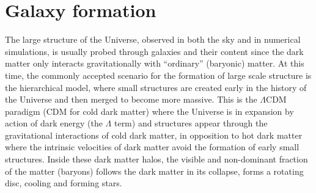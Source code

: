 \section{Galaxy formation}
\label{sec:galaxy_formation}

The large structure of the Universe, observed in both the sky and in numerical
simulations, is usually probed through galaxies and their content since the
dark matter only interacts gravitationally with ``ordinary'' (baryonic) matter.
At this time, the commonly accepted scenario for the formation of large scale
structure is the hierarchical model, where small structures are created early
in the history of the Universe and then merged to become more massive. This is
the $\Lambda$CDM paradigm (CDM for cold dark matter) where the Universe is in
expansion by action of dark energy (the $\Lambda$ term) and structures appear
through the gravitational interactions of cold dark matter, in opposition to
hot dark matter where the intrinsic velocities of dark matter avoid the
formation of early small structures. Inside these dark matter halos, the
visible and non-dominant fraction of the matter (baryons) follows the dark
matter in its collapse, forms a rotating disc, cooling and forming stars.

